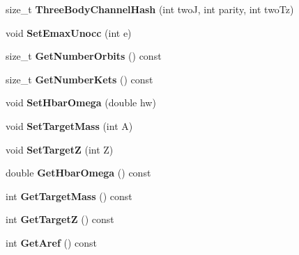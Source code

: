 \begin{DoxyCompactItemize}
\item 
\hypertarget{classModelSpace_a7db0d4744745270504f3afc21219af9e}{size\-\_\-t {\bfseries Three\-Body\-Channel\-Hash} (int two\-J, int parity, int two\-Tz)}\label{classModelSpace_a7db0d4744745270504f3afc21219af9e}

\item 
\hypertarget{classModelSpace_ac93160d95f072cc75d7387ec11018b74}{void {\bfseries Set\-Emax\-Unocc} (int e)}\label{classModelSpace_ac93160d95f072cc75d7387ec11018b74}

\item 
\hypertarget{classModelSpace_a509f8e3c1c4704fbb7e07e907eee91c7}{size\-\_\-t {\bfseries Get\-Number\-Orbits} () const }\label{classModelSpace_a509f8e3c1c4704fbb7e07e907eee91c7}

\item 
\hypertarget{classModelSpace_ab1e423e190eb0747cdcb6ff55f9f9406}{size\-\_\-t {\bfseries Get\-Number\-Kets} () const }\label{classModelSpace_ab1e423e190eb0747cdcb6ff55f9f9406}

\item 
\hypertarget{classModelSpace_abc4f6a563b71977d1e0a99eb5367a2d7}{void {\bfseries Set\-Hbar\-Omega} (double hw)}\label{classModelSpace_abc4f6a563b71977d1e0a99eb5367a2d7}

\item 
\hypertarget{classModelSpace_ab29013a1b7b4b8b26d5905f97c135931}{void {\bfseries Set\-Target\-Mass} (int A)}\label{classModelSpace_ab29013a1b7b4b8b26d5905f97c135931}

\item 
\hypertarget{classModelSpace_a7ad596c6f8c6c850672e1699b12901e4}{void {\bfseries Set\-Target\-Z} (int Z)}\label{classModelSpace_a7ad596c6f8c6c850672e1699b12901e4}

\item 
\hypertarget{classModelSpace_a4cf15b20d8262cdab4ab1cadd412de7f}{double {\bfseries Get\-Hbar\-Omega} () const }\label{classModelSpace_a4cf15b20d8262cdab4ab1cadd412de7f}

\item 
\hypertarget{classModelSpace_a2f6a8428767c064a63796d4fc010e41e}{int {\bfseries Get\-Target\-Mass} () const }\label{classModelSpace_a2f6a8428767c064a63796d4fc010e41e}

\item 
\hypertarget{classModelSpace_ac467562b5c207d25cddc71c4da6a702b}{int {\bfseries Get\-Target\-Z} () const }\label{classModelSpace_ac467562b5c207d25cddc71c4da6a702b}

\item 
\hypertarget{classModelSpace_a91d498d70489e3c652d293b73f58b605}{int {\bfseries Get\-Aref} () const }\label{classModelSpace_a91d498d70489e3c652d293b73f58b605}


\end{DoxyCompactItemize}
